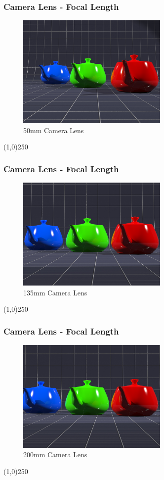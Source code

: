 \begin{frame}
\frametitle{Camera Lens - Focal Length}
\begin{figure}
	\centering
	\includegraphics[height=5.5cm]{img/Cameras/50mm.jpg}
	\caption[50mm Camera Lens]{50mm Camera Lens}
	\label{fig:50mm}
\end{figure}
\end{frame}
\begin{center}\line(1,0){250}\end{center}


\begin{frame}
\frametitle{Camera Lens - Focal Length}
\begin{figure}
	\centering
	\includegraphics[height=5.5cm]{img/Cameras/135mm.jpg}
	\caption[135mm Camera Lens]{135mm Camera Lens}
	\label{fig:135mm}
\end{figure}
\end{frame}
\begin{center}\line(1,0){250}\end{center}


\begin{frame}
\frametitle{Camera Lens - Focal Length}
\begin{figure}
	\centering
	\includegraphics[height=5.5cm]{img/Cameras/200mm.jpg}
	\caption[200mm Camera Lens]{200mm Camera Lens}
	\label{fig:200mm}
\end{figure}
\end{frame}
\begin{center}\line(1,0){250}\end{center}



